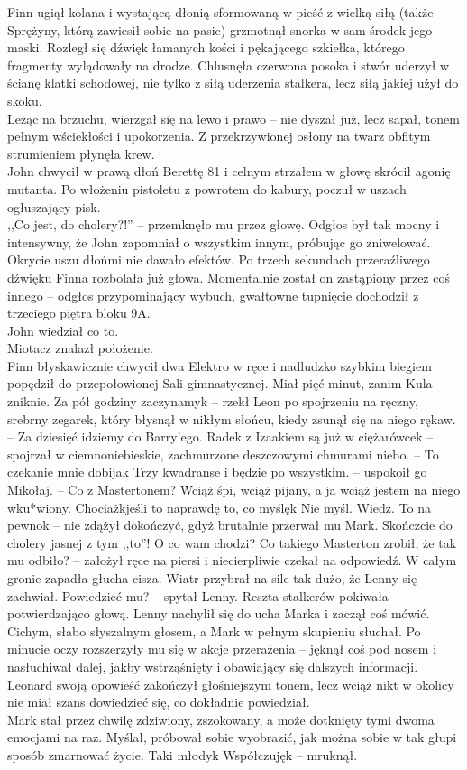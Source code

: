 \documentclass[../MAIN.tex]{subfiles}
\begin{document}
Finn ugiął kolana i wystającą dłonią sformowaną w pieść z wielką siłą (także Sprężyny, którą zawiesił sobie na pasie) grzmotnął snorka w sam środek jego maski. Rozległ się dźwięk łamanych kości i pękającego szkiełka, którego fragmenty wylądowały na drodze. Chlusnęła czerwona posoka i stwór uderzył w ścianę klatki schodowej, nie tylko z siłą uderzenia stalkera, lecz siłą jakiej użył do skoku. \\
Leżąc na brzuchu, wierzgał się na lewo i prawo -- nie dyszał już, lecz sapał, tonem pełnym wściekłości i upokorzenia. Z przekrzywionej osłony na twarz obfitym strumieniem płynęła krew. \\
John chwycił w prawą dłoń Berettę 81 i celnym strzałem w głowę skrócił agonię mutanta. Po włożeniu pistoletu z powrotem do kabury, poczuł w uszach ogłuszający pisk.\\
,,Co jest, do cholery?!'' -- przemknęło mu przez głowę.
Odgłos był tak mocny i intensywny, że John zapomniał o wszystkim innym, próbując go zniwelować. Okrycie uszu dłońmi nie dawało efektów. Po trzech sekundach przeraźliwego dźwięku Finna rozbolała już głowa. Momentalnie został on zastąpiony przez coś innego -- odgłos przypominający wybuch, gwałtowne tupnięcie dochodził z trzeciego piętra bloku 9A.\\
John wiedział co to. \\
Miotacz znalazł położenie.\\
Finn błyskawicznie chwycił dwa Elektro w ręce i nadludzko szybkim biegiem popędził do przepołowionej Sali gimnastycznej. Miał pięć minut, zanim Kula zniknie.
%
%
\sx Za pół godziny zaczynamy\3k -- rzekł Leon po spojrzeniu na ręczny, srebrny zegarek, który błysnął w nikłym słońcu, kiedy zsunął się na niego rękaw. -- Za dziesięć idziemy do Barry’ego. Radek z Izaakiem są już w ciężarówce\3k -- spojrzał w ciemnoniebieskie, zachmurzone deszczowymi chmurami niebo. -- To czekanie mnie dobija\3k
\xx Trzy kwadranse i będzie po wszystkim. -- uspokoił go Mikołaj. -- Co z Mastertonem?
\xx Wciąż śpi, wciąż pijany, a ja wciąż jestem na niego wku*wiony. Chociaż\3kjeśli to naprawdę to, co myślę\3k
\xx Nie myśl. Wiedz. To na pewno\3k -- nie zdążył dokończyć, gdyż brutalnie przerwał mu Mark.
\xx Skończcie do cholery jasnej z tym ,,to''! O co wam chodzi? Co takiego Masterton zrobił, że tak mu odbiło? -- założył ręce na piersi i niecierpliwie czekał na odpowiedź.
\qd
W całym gronie zapadła głucha cisza. Wiatr przybrał na sile tak dużo, że Lenny się zachwiał.
\sx Powiedzieć mu? -- spytał Lenny. \qd
Reszta stalkerów pokiwała potwierdzająco głową.
Lenny nachylił się do ucha Marka i zaczął coś mówić. Cichym, słabo słyszalnym głosem, a Mark w pełnym skupieniu słuchał. Po minucie oczy rozszerzyły mu się w akcje przerażenia -- jęknął coś pod nosem i nasłuchiwał dalej, jakby wstrząśnięty i obawiający się dalszych informacji. Leonard swoją opowieść zakończył głośniejszym tonem, lecz wciąż nikt w okolicy nie miał szans dowiedzieć się, co dokładnie powiedział.\\
Mark stał przez chwilę zdziwiony, zszokowany, a może dotknięty tymi dwoma emocjami na raz. Myślał, próbował sobie wyobrazić, jak można sobie w tak głupi sposób zmarnować życie. Taki młody\3k
\sx Współczuję\3k -- mruknął. \qd
\end{document}
